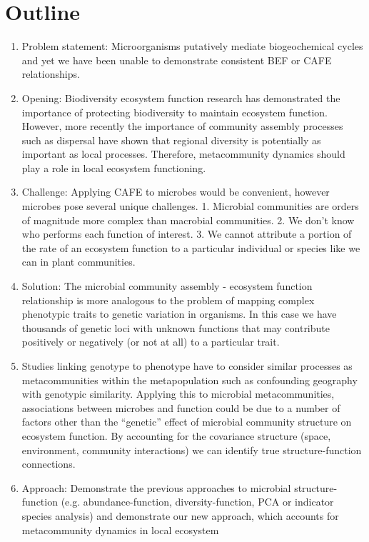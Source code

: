 \documentclass{article}
\begin{document}
\section*{Outline} 
\begin{enumerate} 
  \item Problem statement: Microorganisms putatively mediate biogeochemical
    cycles and yet we have been unable to demonstrate consistent BEF or CAFE
  relationships.   
\item  Opening: Biodiversity ecosystem function research has demonstrated the
  importance of protecting biodiversity to maintain ecosystem function.
  However, more recently the importance of community assembly processes such as
  dispersal have shown that regional diversity is potentially as important as
  local processes. Therefore, metacommunity dynamics should play a role in local
  ecosystem functioning.  
  \item Challenge: Applying CAFE to microbes would be
  convenient, however microbes pose several unique challenges. 1. Microbial
  communities are orders of magnitude more complex than macrobial communities.
  2. We don’t know who performs each function of interest. 3. We cannot
  attribute a portion of the rate of an ecosystem function to a particular
  individual or species like we can in plant communities.  
  \item Solution: The
  microbial community assembly - ecosystem function relationship is more
  analogous to the problem of mapping complex phenotypic traits to genetic
  variation in organisms. In this case we have thousands of genetic loci with
  unknown functions that may contribute positively or negatively (or not at all)
  to a particular trait.  
  \item Studies linking genotype to phenotype have to
  consider similar processes as metacommunities within the
  metapopulation such as confounding geography with genotypic similarity.
  Applying this to microbial metacommunities, associations between microbes and
  function could be due to a number of factors other than the “genetic” effect
  of microbial community structure on ecosystem function. By accounting for the
  covariance structure (space, environment, community interactions) we can
  identify true structure-function connections.  
  \item Approach: Demonstrate the
  previous approaches to microbial structure-function (e.g. abundance-function,
  diversity-function, PCA or indicator species analysis) and demonstrate our new
  approach, which accounts for metacommunity dynamics in local ecosystem

\end{enumerate}
\end{document}
